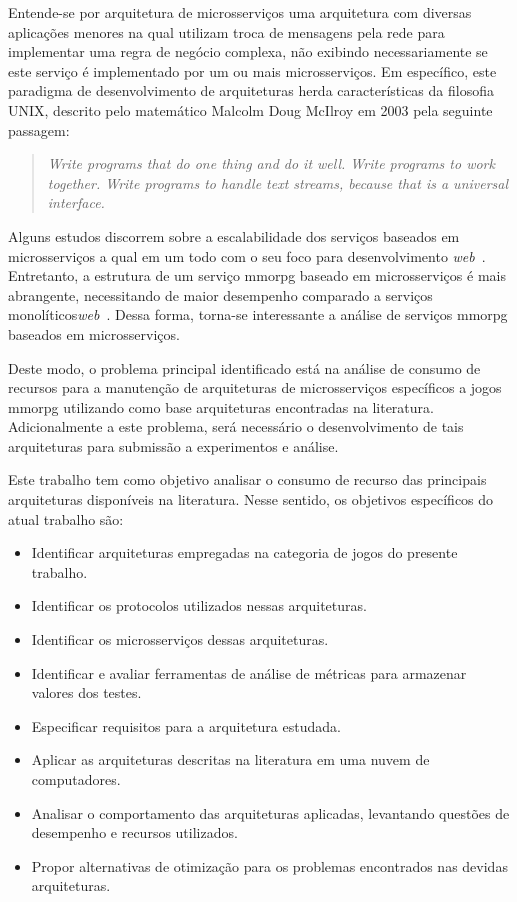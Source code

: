 Entende-se por arquitetura de microsserviços uma arquitetura com diversas aplicações menores na qual utilizam troca de mensagens pela rede  para implementar uma regra de negócio complexa, não exibindo necessariamente se este serviço é implementado por um ou mais microsserviços.
%
Em específico, este paradigma de desenvolvimento de arquiteturas herda características da filosofia UNIX, descrito pelo matemático Malcolm Doug McIlroy em 2003 pela seguinte passagem:

\begin{quotation}
    \textit{Write programs that do one thing and do it well. Write programs to work together. Write programs to handle text streams, because that is a universal interface.}\\
    \cite{Raymond2003Oct}
\end{quotation}

Alguns estudos discorrem sobre a escalabilidade dos serviços baseados em microsserviços a qual em um todo  com o seu foco para desenvolvimento \textit{web}~\cite{photon_engine, mmorpg_culture, DiFrancesco2017Apr}.
%
Entretanto, a estrutura de um serviço \ac{mmorpg} baseado em microsserviços é mais abrangente, necessitando de maior desempenho comparado a serviços monolíticos\textit{web}~\cite{photon_engine, mmorpg_culture}.
%
Dessa forma, torna-se interessante a análise de serviços \ac{mmorpg} baseados em microsserviços.


Deste modo, o problema principal identificado está na análise de consumo de recursos para a manutenção de arquiteturas de microsserviços específicos a jogos \ac{mmorpg} utilizando como base arquiteturas encontradas na literatura.
%
Adicionalmente a este problema, será necessário o desenvolvimento de tais arquiteturas para submissão a experimentos e análise.

Este trabalho tem como objetivo analisar o consumo de recurso das principais arquiteturas disponíveis na literatura.
%
Nesse sentido, os objetivos específicos do atual trabalho são:

\begin{itemize}
    \item Identificar arquiteturas empregadas na categoria de jogos do presente trabalho.
    \item Identificar os protocolos utilizados nessas arquiteturas.
    \item Identificar os microsserviços dessas arquiteturas.
    \item Identificar e avaliar ferramentas de análise de métricas para armazenar valores dos testes.
    \item Especificar requisitos para a arquitetura estudada.
    \item Aplicar as arquiteturas descritas na literatura em uma nuvem de computadores.
    \item Analisar o comportamento das arquiteturas aplicadas, levantando questões de desempenho e recursos utilizados.
    \item Propor alternativas de otimização para os problemas encontrados nas devidas arquiteturas.
\end{itemize}


